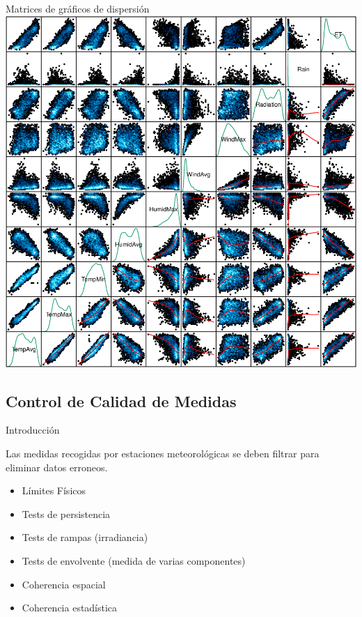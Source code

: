 \documentclass[xcolor={usenames,svgnames,dvipsnames}]{beamer}
\begin{document}
\begin{frame}[label=sec-7-2-5]{Matrices de gráficos de dispersión}
\includegraphics[height=0.9\textheight]{../figs/Splom.png}
\end{frame}

\subsection{Control de Calidad de Medidas}
\label{sec-7-3}

\begin{frame}[label=sec-7-3-1]{Introducción}
\begin{block}{Las medidas recogidas por estaciones meteorológicas se deben filtrar para eliminar datos erroneos.}
\begin{itemize}
\item Límites Físicos
\item Tests de persistencia
\item Tests de rampas (irradiancia)
\item Tests de envolvente (medida de varias componentes)
\item Coherencia espacial
\item Coherencia estadística
\end{itemize}
\end{block}
\end{frame}
\end{document}
